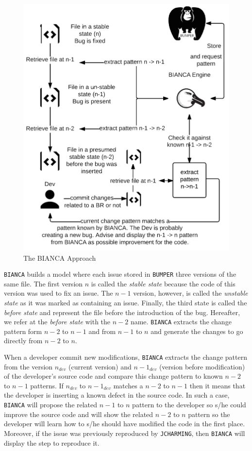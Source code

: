 \begin{figure}[h!]
  \centering
    \includegraphics{media/bianca-approach.png}
    \caption{The BIANCA Approach
    \label{fig:bianca-approach}}
\end{figure}

{\tt BIANCA} builds a model where each issue stored in {\tt BUMPER} three versions of the same file. 
The first version $n$ is called the {\it stable state} because the code of this version was used to fix an issue. 
The $n-1$ version, however, is called the {\it unstable state} as it was marked as containing an issue. 
Finally, the third state is called the {\it before state} and represent the file before the introduction of the bug. 
Hereafter, we refer at the {\it before state} with the $n-2$ name. 
{\tt BIANCA} extracts the change pattern form $n-2$ to $n-1$ and from $n-1$ to $n$ and generate the changes to go directly from $n-2$ to $n$.

When a developer commit new modifications, {\tt BIANCA} extracts the change pattern from the version $n_{dev}$ (current version) and $n-1_{dev}$ (version before modification) of the developer's source code and compare this change pattern to known $n-2$ to $n-1$ patterns. 
If $n_{dev}$ to $n-1_{dev}$ matches a $n-2$ to $n-1$ then it means that the developer is inserting a known defect in the source code. 
In such a case, {\tt BIANCA} will propose the related $n-1$ to $n$ pattern to the developer so s/he could improve the source code and will show the related $n-2$ to $n$ pattern so the developer will learn how to s/he should have modified the code in the first place. Moreover, if the issue was previously reproduced by {\tt JCHARMING}, then {\tt BIANCA} will display the step to reproduce it.

